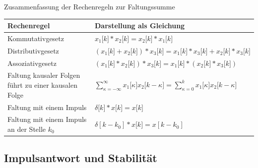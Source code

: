 \begin{summary}{Zusammenfassung der Rechenregeln zur Faltungssumme}
\begin{center}
  \begin{tabular}{ll}
    \toprule
    Rechenregel & Darstellung als Gleichung \\
    \midrule
    Kommutativgesetz & \(x_{1}\lbrack k\rbrack*x_{2}\lbrack k\rbrack = x_{2}\lbrack k\rbrack*x_{1}\lbrack k\rbrack\) \\
    Distributivgesetz & \(\left( x_{1}\lbrack k\rbrack + x_{2}\lbrack k\rbrack \right)*x_{3}\lbrack k\rbrack = x_{1}\lbrack k\rbrack*x_{3}\lbrack k\rbrack + x_{2}\lbrack k\rbrack*x_{3}\lbrack k\rbrack\) \\
    Assoziativgesetz & \(\left( x_{1}\lbrack k\rbrack*x_{2}\lbrack k\rbrack \right)*x_{3}\lbrack k\rbrack = x_{1}\lbrack k\rbrack*\left( x_{2}\lbrack k\rbrack*x_{3}\lbrack k\rbrack \right)\) \\
    Faltung kausaler Folgen 
führt zu einer kausalen Folge
 & \(\sum\limits_{\kappa = - \infty}^{\infty}{x_{1}\lbrack\kappa\rbrack  x_{2}\lbrack k - \kappa\rbrack} = \sum\limits_{\kappa = 0}^{k}{x_{1}\lbrack\kappa\rbrack  x_{2}\lbrack k - \kappa\rbrack}\) \\
    Faltung mit einem Impuls & \(\delta\lbrack k\rbrack*x\lbrack k\rbrack = x\lbrack k\rbrack\) \\
    Faltung mit einem Impuls an der Stelle \(k_{0}\) & \(\delta\left\lbrack k - k_{0} \right\rbrack*x\lbrack k\rbrack = x\left\lbrack k - k_{0} \right\rbrack\) \\
    \bottomrule
  \end{tabular}
\end{center}
\end{summary}

\subsection{Impulsantwort und Stabilität}\label{sec:4.4.4}

